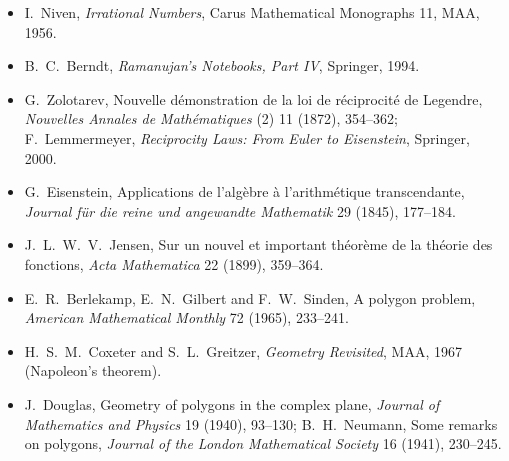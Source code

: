 \begin{itemize}
{Mathematik} 53 (1857), 173--175; D.~H.~Lehmer, Factorization of certain cyclotomic functions, \emph{Annals of Mathematics} 34
(1933), 461--479.
\item I.~Niven, \emph{Irrational Numbers}, Carus Mathematical Monographs 11, MAA, 1956.
\item B.~C.~Berndt, \emph{Ramanujan's Notebooks, Part IV}, Springer, 1994.
\item G.~Zolotarev, Nouvelle démonstration de la loi de réciprocité de Legendre, \emph{Nouvelles Annales de Mathématiques} (2) 11
(1872), 354--362; F.~Lemmermeyer, \emph{Reciprocity Laws: From Euler to Eisenstein}, Springer, 2000.
\item G.~Eisenstein, Applications de l'algèbre à l'arith\-métique trans\-cendante, \emph{Journal für die reine und angewandte
Mathematik} 29 (1845), 177--184.
\item J.~L.~W.~V.~Jensen, Sur un nouvel et important théorème de la théorie des fonctions, \emph{Acta Mathematica} 22 (1899),
359--364.
\item E.~R.~Berlekamp, E.~N.~Gilbert and F.~W.~Sinden, A polygon problem, \emph{American Mathematical Monthly} 72 (1965),
233--241.
\item H.~S.~M.~Coxeter and S.~L.~Greitzer, \emph{Geometry Revisited}, MAA, 1967 (Napoleon's theorem).
\item J.~Douglas, Geometry of polygons in the complex plane, \emph{Journal of Mathematics and Physics} 19 (1940), 93--130;
B.~H.~Neumann, Some remarks on polygons, \emph{Journal of the London Mathematical Society} 16 (1941), 230--245.
\end{itemize}
